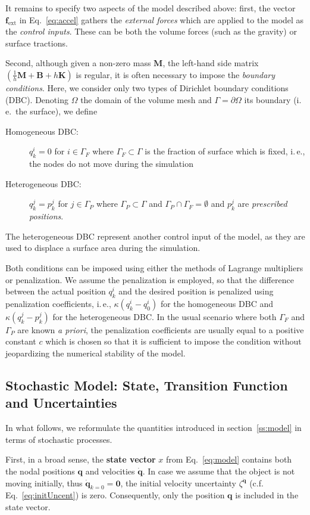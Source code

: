 \documentclass[paper=a4, fontsize=11pt]{article}
\def\ie{i.\,e.}
\def\pos{\mathbf{q}}
\def\vel{\mathbf{\dot{q}}}
\def\mass{\mathbf{M}}
\def\damp{\mathbf{B}}
\def\stiff{\mathbf{K}}
\def\fext{\mathbf{f}_{\text{ext}}}
\begin{document}
It remains to specify two aspects of the model described above: first, the vector $\fext$ in 
Eq.~\ref{eq:accel} gathers the \emph{external forces} which are applied to the model as the 
\emph{control inputs}. These can be both the volume forces (such as the gravity) or surface tractions. 

Second, although given a non-zero mass $\mass$, the left-hand side matrix $(\frac{1}{h}\mass + \damp + h\stiff)$ 
is regular, it is often necessary to impose the \emph{boundary conditions}. Here, we consider 
only two types of Dirichlet boundary conditions (DBC). Denoting $\Omega$ the domain of the volume mesh and $\Gamma = \partial\Omega$ 
its boundary (\ie~the surface), we define
\begin{description}
	\item[Homogeneous DBC:] $q^i_k = 0$ for $i\in\Gamma_F$ where $\Gamma_F\subset\Gamma$ is 
	the fraction of surface which is fixed, \ie, the nodes do not move during the simulation
	\item[Heterogeneous DBC:] $q^j_k = p^j_k$ for $j\in\Gamma_P$ where $\Gamma_P\subset\Gamma$ and 
	$\Gamma_P \cap \Gamma_F = \emptyset$ and $p^j_k$ are \emph{prescribed positions}.
\end{description}
The heterogeneous DBC represent another control input of the model, as they are used to displace a surface 
area during the simulation. 

Both conditions can be imposed using either the methods of Lagrange multipliers or penalization.
We assume the penalization is employed, so that the difference between the actual position $q^i_k$ and 
the desired position is penalized using penalization coefficients, \ie, $\kappa(q^i_k - q^i_0)$ for the homogeneous
DBC and $\kappa(q^j_k - p^j_k)$ for the heterogeneous DBC. In the usual scenario where both $\Gamma_F$ and $\Gamma_P$ are known 
\emph{a priori}, the penalization coefficients are usually equal to a positive constant $c$ which is chosen so that 
it is sufficient to impose the condition without jeopardizing the numerical stability of the model.  

\subsection{Stochastic Model: State, Transition Function and Uncertainties}
\label{ss:smodel}
In what follows, we reformulate the quantities introduced in section~\ref{ss:model} in terms of stochastic processes. 

First, in a broad sense, the {\bf state vector} $x$ from Eq.~\ref{eq:model} contains 
both the nodal positions $\pos$ and velocities $\vel$. 
In case we assume that the object is not moving initially, thus $\vel_{k=0} = \mathbf{0}$,  
the initial velocity uncertainty $\zeta^\vel$ (c.f. Eq.~\ref{eq:initUncent}) is zero.
Consequently, only the position $\pos$ is included in the state vector.
\end{document}
